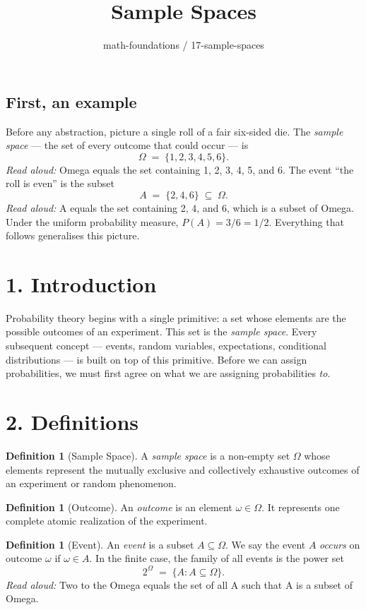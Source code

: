 \documentclass[11pt]{article}
\title{Sample Spaces}
\author{math-foundations / 17-sample-spaces}
\date{}
\theoremstyle{definition}
\newtheorem{definition}[theorem]{Definition}
\begin{document}
\maketitle

\subsection*{First, an example}

Before any abstraction, picture a single roll of a fair six-sided die. The
\emph{sample space} --- the set of every outcome that could occur --- is
\[
\Omega \;=\; \{1, 2, 3, 4, 5, 6\}.
\]
\emph{Read aloud:} Omega equals the set containing 1, 2, 3, 4, 5, and 6.
The event ``the roll is even'' is the subset
\[
A \;=\; \{2, 4, 6\} \;\subseteq\; \Omega.
\]
\emph{Read aloud:} A equals the set containing 2, 4, and 6, which is a subset of Omega.
Under the uniform probability measure, $P(A) = 3/6 = 1/2$. Everything that
follows generalises this picture.

\section*{1. Introduction}

Probability theory begins with a single primitive: a set whose elements are
the possible outcomes of an experiment. This set is the \emph{sample space}.
Every subsequent concept --- events, random variables, expectations,
conditional distributions --- is built on top of this primitive. Before
we can assign probabilities, we must first agree on what we are assigning
probabilities \emph{to}.

\section*{2. Definitions}

\begin{definition}[Sample Space]
A \emph{sample space} is a non-empty set $\Omega$ whose elements represent
the mutually exclusive and collectively exhaustive outcomes of an
experiment or random phenomenon.
\end{definition}

\begin{definition}[Outcome]
An \emph{outcome} is an element $\omega \in \Omega$. It represents one
complete atomic realization of the experiment.
\end{definition}

\begin{definition}[Event]
An \emph{event} is a subset $A \subseteq \Omega$. We say the event $A$
\emph{occurs} on outcome $\omega$ if $\omega \in A$. In the finite case,
the family of all events is the power set
\[
2^{\Omega} \;=\; \{A : A \subseteq \Omega\}.
\]
\emph{Read aloud:} Two to the Omega equals the set of all A such that A is a subset of Omega.
\end{definition}
\end{document}
